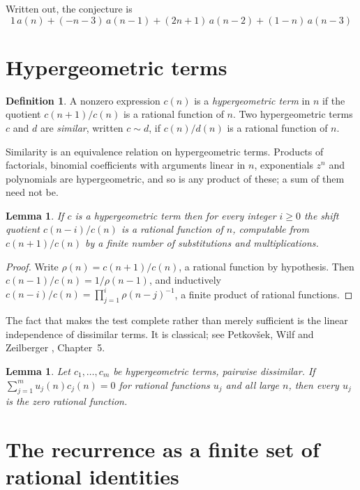 \documentclass[11pt,a4paper]{article}
\theoremstyle{plain}
\newtheorem{lemma}[theorem]{Lemma}
\theoremstyle{definition}
\newtheorem{definition}[theorem]{Definition}
\begin{document}
Written out, the conjecture is
\begin{equation}\label{eq:conj}
1\,a(n) + (- n - 3)\,a(n-1) + (2 n + 1)\,a(n-2) + (1 - n)\,a(n-3)
\end{equation}

\section{Hypergeometric terms}

\begin{definition}
A nonzero expression $c(n)$ is a \emph{hypergeometric term} in $n$ if the quotient
$c(n+1)/c(n)$ is a rational function of $n$. Two hypergeometric terms $c$ and $d$ are
\emph{similar}, written $c\sim d$, if $c(n)/d(n)$ is a rational function of $n$.
\end{definition}

Similarity is an equivalence relation on hypergeometric terms. Products of factorials,
binomial coefficients with arguments linear in $n$, exponentials $z^{n}$ and polynomials
are hypergeometric, and so is any product of these; a sum of them need not be.

\begin{lemma}\label{lem:shift}
If $c$ is a hypergeometric term then for every integer $i\ge 0$ the shift quotient
$c(n-i)/c(n)$ is a rational function of $n$, computable from $c(n+1)/c(n)$ by a finite
number of substitutions and multiplications.
\end{lemma}

\begin{proof}
Write $\rho(n)=c(n+1)/c(n)$, a rational function by hypothesis. Then
$c(n-1)/c(n)=1/\rho(n-1)$, and inductively
$c(n-i)/c(n)=\prod_{j=1}^{i}\rho(n-j)^{-1}$, a finite product of rational functions.
\end{proof}

The fact that makes the test complete rather than merely sufficient is the linear
independence of dissimilar terms. It is classical; see Petkov\v{s}ek, Wilf and Zeilberger
\cite{AB}, Chapter~5.

\begin{lemma}\label{lem:indep}
Let $c_{1},\dots,c_{m}$ be hypergeometric terms, pairwise dissimilar. If
$\sum_{j=1}^{m}u_{j}(n)c_{j}(n)=0$ for rational functions $u_{j}$ and all large $n$, then
every $u_{j}$ is the zero rational function.
\end{lemma}

\section{The recurrence as a finite set of rational identities}
\end{document}
